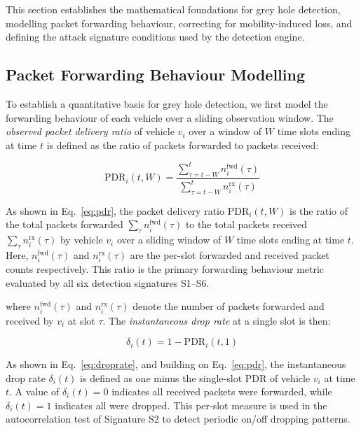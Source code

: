 \documentclass[12pt, a4paper]{report}
\begin{document}
This section establishes the mathematical foundations for grey hole detection,
modelling packet forwarding behaviour, correcting for mobility-induced loss,
and defining the attack signature conditions used by the detection engine.

\subsection{Packet Forwarding Behaviour Modelling}

To establish a quantitative basis for grey hole detection, we first model the
forwarding behaviour of each vehicle over a sliding observation window. The
\emph{observed packet delivery ratio} of vehicle $v_i$ over a window of $W$
time slots ending at time $t$ is defined as the ratio of packets forwarded to
packets received:

\begin{equation}
\label{eq:pdr}
\text{PDR}_i(t, W) = \frac{\displaystyle\sum_{\tau=t-W}^{t} n_i^{\text{fwd}}(\tau)}
                           {\displaystyle\sum_{\tau=t-W}^{t} n_i^{\text{rx}}(\tau)}
\end{equation}

As shown in Eq.~\eqref{eq:pdr}, the packet delivery ratio $\text{PDR}_i(t, W)$ is the ratio of the total packets forwarded $\sum_\tau n_i^{\text{fwd}}(\tau)$ to the total packets received $\sum_\tau n_i^{\text{rx}}(\tau)$ by vehicle $v_i$ over a sliding window of $W$ time slots ending at time $t$. Here, $n_i^{\text{fwd}}(\tau)$ and $n_i^{\text{rx}}(\tau)$ are the per-slot forwarded and received packet counts respectively. This ratio is the primary forwarding behaviour metric evaluated by all six detection signatures S1--S6.

\noindent where $n_i^{\text{fwd}}(\tau)$ and $n_i^{\text{rx}}(\tau)$ denote
the number of packets forwarded and received by $v_i$ at slot $\tau$.
The \emph{instantaneous drop rate} at a single slot is then:

\begin{equation}
\label{eq:droprate}
\delta_i(t) = 1 - \text{PDR}_i(t, 1)
\end{equation}

As shown in Eq.~\eqref{eq:droprate}, and building on Eq.~\eqref{eq:pdr}, the instantaneous drop rate $\delta_i(t)$ is defined as one minus the single-slot PDR of vehicle $v_i$ at time $t$. A value of $\delta_i(t) = 0$ indicates all received packets were forwarded, while $\delta_i(t) = 1$ indicates all were dropped. This per-slot measure is used in the autocorrelation test of Signature S2 to detect periodic on/off dropping patterns.
\end{document}
